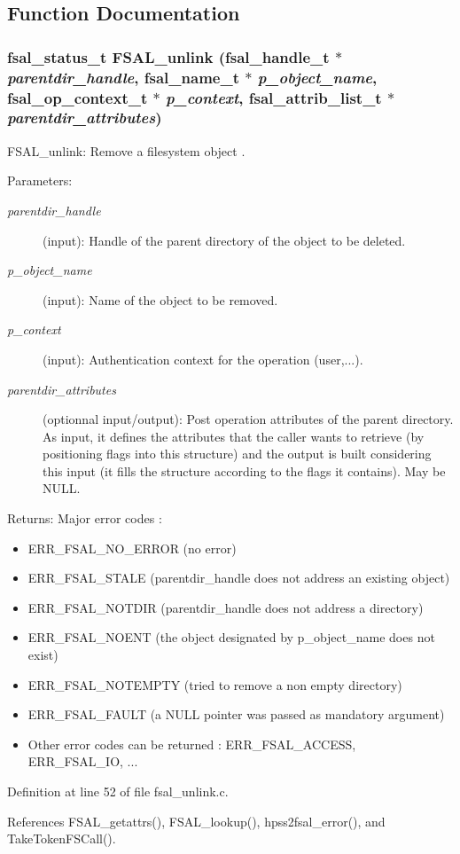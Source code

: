 \subsection{Function Documentation}
\subsubsection[{FSAL\_\-unlink}]{\setlength{\rightskip}{0pt plus 5cm}fsal\_\-status\_\-t FSAL\_\-unlink (fsal\_\-handle\_\-t $\ast$ {\em parentdir\_\-handle}, \/  fsal\_\-name\_\-t $\ast$ {\em p\_\-object\_\-name}, \/  fsal\_\-op\_\-context\_\-t $\ast$ {\em p\_\-context}, \/  fsal\_\-attrib\_\-list\_\-t $\ast$ {\em parentdir\_\-attributes})}\label{fsal__unlink_8c_313314120a0ca14f6b41aea997f47285}


FSAL\_\-unlink: Remove a filesystem object .

\begin{Desc}
\item[Parameters:]
\begin{description}
\item[{\em parentdir\_\-handle}](input): Handle of the parent directory of the object to be deleted. \item[{\em p\_\-object\_\-name}](input): Name of the object to be removed. \item[{\em p\_\-context}](input): Authentication context for the operation (user,...). \item[{\em parentdir\_\-attributes}](optionnal input/output): Post operation attributes of the parent directory. As input, it defines the attributes that the caller wants to retrieve (by positioning flags into this structure) and the output is built considering this input (it fills the structure according to the flags it contains). May be NULL.\end{description}
\end{Desc}
\begin{Desc}
\item[Returns:]Major error codes :\begin{itemize}
\item ERR\_\-FSAL\_\-NO\_\-ERROR (no error)\item ERR\_\-FSAL\_\-STALE (parentdir\_\-handle does not address an existing object)\item ERR\_\-FSAL\_\-NOTDIR (parentdir\_\-handle does not address a directory)\item ERR\_\-FSAL\_\-NOENT (the object designated by p\_\-object\_\-name does not exist)\item ERR\_\-FSAL\_\-NOTEMPTY (tried to remove a non empty directory)\item ERR\_\-FSAL\_\-FAULT (a NULL pointer was passed as mandatory argument)\item Other error codes can be returned : ERR\_\-FSAL\_\-ACCESS, ERR\_\-FSAL\_\-IO, ... \end{itemize}
\end{Desc}


Definition at line 52 of file fsal\_\-unlink.c.

References FSAL\_\-getattrs(), FSAL\_\-lookup(), hpss2fsal\_\-error(), and TakeTokenFSCall().